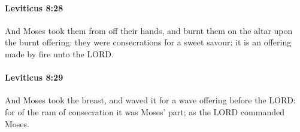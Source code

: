 		\paragraph{Leviticus 8:28} %
			\label{LEVITICUS-8-28}

			And Moses took them from off their hands, and burnt them on the altar upon the burnt offering: they were consecrations for a sweet savour: it is an offering made by fire unto the LORD.


		\paragraph{Leviticus 8:29} %
			\label{LEVITICUS-8-29}

			And Moses took the breast, and waved it for a wave offering before the LORD: for of the ram of consecration it was Moses’ part; as the LORD commanded Moses.



